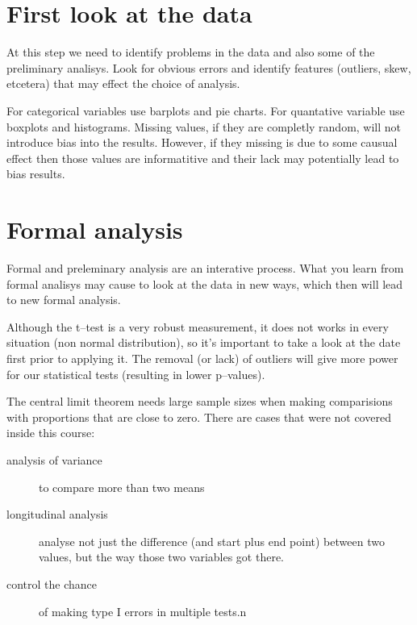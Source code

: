 \section{First look at the data}

At this step we need to identify problems in the data and also some of the
preliminary analisys. Look for obvious errors and identify features (outliers,
skew, etcetera) that may effect the choice of analysis.

For categorical variables use barplots and pie charts. For quantative variable
use boxplots and histograms. Missing values, if they are completly random, will
not introduce bias into the results. However, if they missing is due to some
causual effect then those values are informatitive and their lack may
potentially lead to bias results.

\section{Formal analysis}

Formal and preleminary analysis are an interative process. What you learn from
formal analisys may cause to look at the data in new ways, which then will lead
to new formal analysis.

Although the t--test is a very robust measurement, it does not works in every
situation (non normal distribution), so it's important to take a look at the
date first prior to applying it. The removal (or lack) of outliers will give
more power for our statistical tests (resulting in lower p--values).

The central limit theorem needs large sample sizes when making comparisions with
proportions that are close to zero. There are cases that were not covered inside
this course:

\begin{description}
	\item[analysis of variance] to compare more than two means
	\item[longitudinal analysis] analyse not just the difference (and start plus
	      end point) between two values, but the way those two variables got there.
	\item[control the chance] of making type I errors in multiple tests.n
\end{description}
